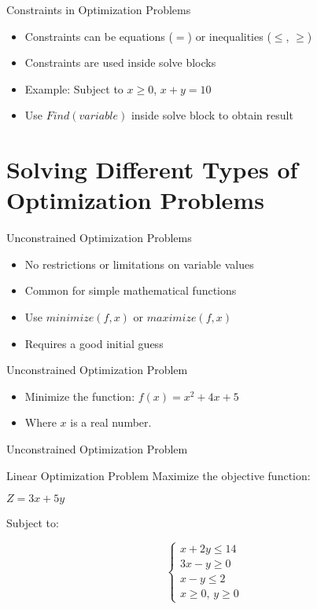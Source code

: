 \documentclass{beamer}
\begin{document}
\begin{frame}{Constraints in Optimization Problems}
\begin{itemize}
\item Constraints can be equations ($=$) or inequalities ($\leq$, $\geq$)
\item Constraints are used inside solve blocks
\item Example: Subject to $x \geq 0$, $x + y = 10$
\item Use $Find(variable)$ inside solve block to obtain result
\end{itemize}
\end{frame}

\section{Solving Different Types of Optimization Problems}

\begin{frame}{Unconstrained Optimization Problems}
\begin{itemize}
\item No restrictions or limitations on variable values
\item Common for simple mathematical functions
\item Use $minimize(f, x)$ or $maximize(f, x)$
\item Requires a good initial guess
\end{itemize}
\end{frame}

\begin{frame}{Unconstrained Optimization Problem}
\begin{itemize}
\item Minimize the function: $f(x) = x^2 + 4x + 5$
\item Where $x$ is a real number.
\end{itemize}
\end{frame}

\begin{frame}{Unconstrained Optimization Problem}
\end{frame}

\begin{frame}{Linear Optimization Problem}
Maximize the objective function:
\begin{center}
$Z = 3x + 5y$
\end{center}
Subject to:
\begin{center}
$$\begin{cases}
	x + 2y \leq 14 \\
	3x - y \geq 0 \\
	x - y \leq 2 \\
	x \geq 0, \, y \geq 0
\end{cases}$$
\end{center}
\end{frame}
\end{document}
